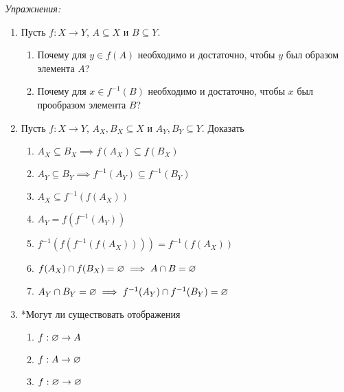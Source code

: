
\pagebreak

{\it Упражнения:}
\begin{enumerate}
  \item{}Пусть ${f:X\to Y}$, $A\subseteq X$ и $B\subseteq Y$.
  \begin{enumerate}
    \item{}Почему для $y\in f(A)$ необходимо и достаточно,
    чтобы $y$ был образом элемента $A$?
    \item{}Почему для $x\in f^{-1}(B)$ необходимо и достаточно,
    чтобы $x$ был прообразом элемента $B$?
  \end{enumerate}
  \item{}Пусть ${f:X\to Y}$, ${A_{X},B_{X}\subseteq X}$ и
  ${A_{Y},B_{Y}\subseteq Y}$. Доказать
  \begin{fullwidth}
    \begin{multicols}{2}
      \begin{enumerate}
        \item{}$A_{X}\subseteq B_{X}\implies f(A_{X})\subseteq f(B_{X})$
        \item{}$A_{Y}\subseteq B_{Y}\implies f^{-1}(A_{Y})\subseteq f^{-1}(B_{Y})$
        \item{}$A_{X}\subseteq f^{-1}(f(A_{X}))$
        \item{}$A_{Y}=f(f^{-1}(A_{Y}))$
        \item{}$f^{-1}(f(f^{-1}(f(A_{X}))))=f^{-1}(f(A_{X}))$
        \item{}$f(A_{X})\cap f(B_{X})=\varnothing\implies A\cap B=\varnothing$
        \item{}$A_{Y}\cap B_{Y}=\varnothing\implies f^{-1}(A_{Y})\cap f^{-1}(B_{Y})=\varnothing$
      \end{enumerate}
    \end{multicols}
  \end{fullwidth}
  \item{}*Могут ли существовать отображения
  \begin{multicols}{3}
    \begin{enumerate}
      \item{}$f:\varnothing\to A$
      \item{}$f:A\to\varnothing$
      \item{}$f:\varnothing\to\varnothing$
    \end{enumerate}
  \end{multicols}
\end{enumerate}


